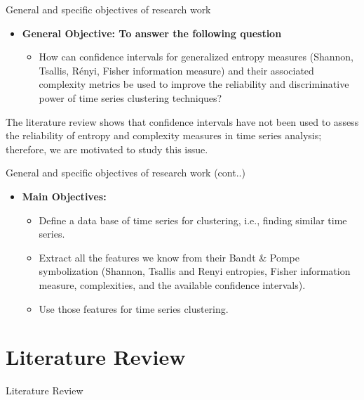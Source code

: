 \documentclass{beamer}
\begin{document}
\begin{frame}{General and specific objectives of research work}
	\begin{itemize}
		\item \textbf{General Objective: To answer the following question}
		\begin{itemize}
			\item How can confidence intervals for generalized entropy measures (Shannon, Tsallis, Rényi, Fisher information measure) and their associated complexity metrics be used to improve the 
			reliability and discriminative power of time series clustering techniques?
		\end{itemize}
	\end{itemize}		
		
The literature review shows that confidence intervals have not been used to assess the reliability of entropy and complexity measures in time series analysis; therefore, we are motivated to study this issue.
\end{frame}

\begin{frame}{General and specific objectives of research work (cont..)}
\begin{itemize}
	\item \textbf{Main Objectives:}
	\begin{itemize}
		\item Define a data base of time series for clustering, i.e., finding similar time series. 
		\item Extract all the features we know from their Bandt \& Pompe symbolization (Shannon, Tsallis and Renyi entropies, Fisher information measure, complexities, and the available confidence intervals).
		\item Use those features for time series clustering.
	\end{itemize} 
\end{itemize}	

\end{frame}


\section{Literature Review}
\begin{frame}
	\begin{center}
		\alert{Literature Review}
	\end{center}
\end{frame}
\end{document}
